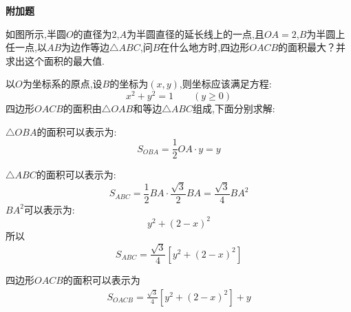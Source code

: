 \begin{questions}
	\begin{center}
		\textbf{附加题}
	\end{center}

	\question
	如图所示,半圆$O$的直径为$2$,$A$为半圆直径的延长线上的一点,且$OA=2$,$B$为半圆上任一点,以$AB$为边作等边$\triangle{ABC}$,问$B$在什么地方时,四边形$OACB$的面积最大？并求出这个面积的最大值.
	\begin{figure*}[ht]
		\centering
	\end{figure*}
	\begin{solution}
		以$O$为坐标系的原点,设$B$的坐标为$(x,y)$,则坐标应该满足方程:
		\begin{equation*}
			x^2 + y^2 = 1 \qquad (y \geqslant 0)
		\end{equation*}
		四边形$OACB$的面积由$\triangle{OAB}$和等边$\triangle{ABC}$组成,下面分别求解:
		\begin{cenum}
			\item $\triangle{OBA}$的面积可以表示为:
			      \begin{equation*}
				      S_{OBA} = \frac12 OA \cdot y = y
			      \end{equation*}
			\item $\triangle{ABC}$的面积可以表示为:
			      \begin{equation*}
				      S_{ABC} = \frac12BA\cdot\frac{\sqrt{3}}{2}BA = \frac{\sqrt{3}}{4}BA^2
			      \end{equation*}
			      $BA^2$可以表示为:
			      \begin{equation*}
				      y^2 + (2-x)^2
			      \end{equation*}
			      所以
			      \begin{equation*}
				      S_{ABC} = \frac{\sqrt{3}}{4}[y^2 + (2-x)^2]
			      \end{equation*}
			\item 四边形$OACB$的面积可以表示为
			      \begin{align*}
				      S_{OACB} = \frac{\sqrt{3}}{4}[y^2 + (2-x)^2] + y
			      \end{align*}

\end{cenum}
\end{solution}
\end{questions}
